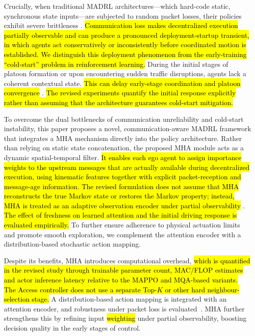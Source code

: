 \documentclass{ieeeaccess}
\begin{document}
Crucially, when traditional MADRL architectures—which hard-code static, synchronous state inputs—are subjected to random packet losses, their policies exhibit severe brittleness \cite{11016811}. \hl{Communication loss makes decentralized execution partially observable and can produce a pronounced deployment-startup transient, in which agents act conservatively or inconsistently before coordinated motion is established. We distinguish this deployment phenomenon from the early-training ``cold-start'' problem in reinforcement learning\cite{Xiao04072022,LI2025130105}.} During the initial stages of platoon formation or upon encountering sudden traffic disruptions, agents lack a coherent contextual state. \hl{This can delay early-stage coordination and platoon convergence} \cite{Zhang2020DeterministicPR}. \hl{The revised experiments quantify the initial response explicitly rather than assuming that the architecture guarantees cold-start mitigation.}


To overcome the dual bottlenecks of communication unreliability and cold-start instability, this paper proposes a novel, communication-aware MADRL framework that integrates a MHA mechanism directly into the policy architecture. Rather than relying on static state concatenation, the proposed MHA module acts as a dynamic spatial-temporal filter. \hl{It enables each ego agent to assign importance weights to the upstream messages that are actually available during decentralized execution, using kinematic features together with explicit packet-reception and message-age information. The revised formulation does not assume that MHA reconstructs the true Markov state or restores the Markov property; instead, MHA is treated as an adaptive observation encoder under partial observability} \cite{Vaswani2017}. \hl{The effect of freshness on learned attention and the initial driving response is evaluated empirically.} To further ensure adherence to physical actuation limits and promote smooth exploration, we complement the attention encoder with a distribution-based stochastic action mapping.


Despite its benefits, MHA introduces computational overhead, \hl{which is quantified in the revised study through trainable parameter count, MAC/FLOP estimates and actor inference latency relative to the MAPPO and MQA-based variants. The Access controller does not use a separate Top-$K$ or other hard neighbour-selection stage.} A distribution-based action mapping is integrated with an attention encoder, and robustness under packet loss is evaluated~\cite{cai2024multi}. MHA further strengthens this by refining input \hl{weighting} under partial observability, boosting decision quality in the early stages of control.
\end{document}
